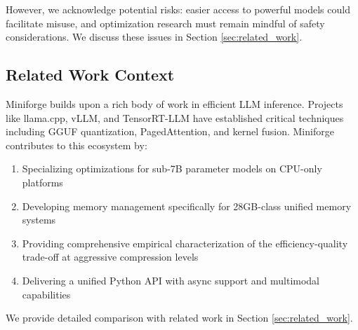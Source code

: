 However, we acknowledge potential risks: easier access to powerful models could facilitate misuse, and optimization research must remain mindful of safety considerations. We discuss these issues in Section \ref{sec:related_work}.

\subsection{Related Work Context}

Miniforge builds upon a rich body of work in efficient LLM inference. Projects like llama.cpp, vLLM, and TensorRT-LLM have established critical techniques including GGUF quantization, PagedAttention, and kernel fusion. Miniforge contributes to this ecosystem by:

\begin{enumerate}
    \item Specializing optimizations for sub-7B parameter models on CPU-only platforms
    \item Developing memory management specifically for 28GB-class unified memory systems
    \item Providing comprehensive empirical characterization of the efficiency-quality trade-off at aggressive compression levels
    \item Delivering a unified Python API with async support and multimodal capabilities
\end{enumerate}

We provide detailed comparison with related work in Section \ref{sec:related_work}.
